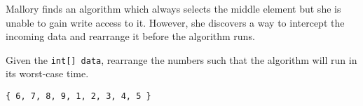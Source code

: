 \question Mallory finds an algorithm which always selects the middle element but she is unable to gain write access to it. However, she discovers a way to intercept the incoming data and rearrange it before the algorithm runs.

Given the \texttt{int[] data}, rearrange the numbers such that the algorithm will run in its worst-case time.

\begin{solution}[1in]
\begin{verbatim}
{ 6, 7, 8, 9, 1, 2, 3, 4, 5 }
\end{verbatim}
\end{solution}